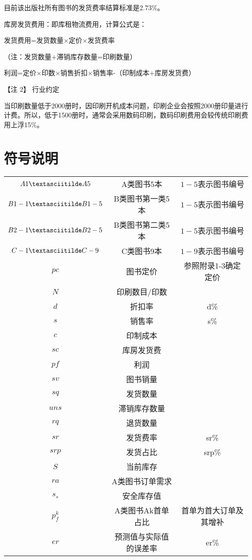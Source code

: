 \documentclass[bwprint]{gmcmthesis}
\begin{document}
目前该出版社所有图书的发货费率结算标准是2.73\%。

库房发货费用：即库租物流费用，计算公式是：

发货费用=发货数量×定价×发货费率

（注：发货数量+滞销库存数量=印刷数量）

利润=定价×印数×销售折扣×销售率-（印制成本+库房发货费）			


【注 2】 行业约定

    当印刷数量低于2000册时，因印刷开机成本问题，印刷企业会按照2000册印量进行计费。所以，低于1500册时，通常会采用数码印刷，数码印刷费用会较传统印刷费用上浮15\%。

\newpage

\section{符号说明}
\begin{tabular}{ccc}
	\hline
	\makebox[0.1\textwidth][c]{符号}	&  \makebox[0.35\textwidth][c]{意义} &\makebox[0.35\textwidth][c]{注释} \\ \hline
	$A1\textasciitilde A5$	    & A类图书5本 & $1-5$表示图书编号 \\ \hline
	$B1-1\textasciitilde B1-5$	    & B类图书第一类5本 & $1-5$表示图书编号 \\ \hline
	$B2-1\textasciitilde B2-5$	    & B类图书第二类5本 & $1-5$表示图书编号 \\ \hline
	$C-1\textasciitilde C-9$	    & C类图书9本 & $1-9$表示图书编号 \\ \hline
	$pc$	    & 图书定价 & 参照附录1-3确定定价  \\ \hline
	$N$	    & 印刷数目/印数 &   \\ \hline
	$d$	    & 折扣率 & d\% \\ \hline
	$s$	    & 销售率 & s\%  \\ \hline
	$c$	    & 印制成本 &   \\ \hline
	$sc$	    & 库房发货费 &   \\ \hline
	$pf$	    & 利润 &  \\ \hline
	$sv$	    & 图书销量 &   \\ \hline
	$sq$	    & 发货数量 &   \\ \hline
	$uns$	    & 滞销库存数量 &   \\ \hline
	$rq$	    & 退货数量 &   \\ \hline
	$sr$	    & 发货费率 & sr\% \\ \hline
	$srp$	    & 发货占比 & srp\%  \\ \hline
	$S$	    & 当前库存 &  \\ \hline
	$ra$	    & A类图书订单需求 &  \\ \hline
	$s_s$	    & 安全库存值 &   \\ \hline
	$p^k_f$	    & A类图书Ak首单占比 & 首单为首大订单及其增补  \\ \hline
	$er$	    & 预测值与实际值的误差率 & er\%  \\ \hline
\end{tabular}
\newpage
\end{document}
